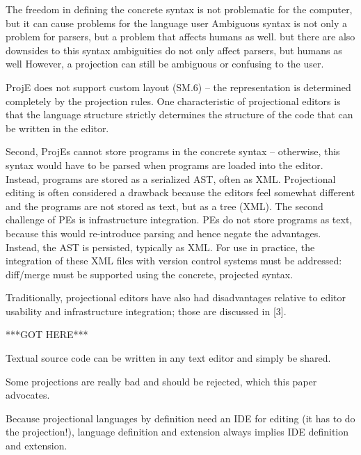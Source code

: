The freedom in defining the concrete syntax is not problematic for the computer, but it can cause problems for the language user 
Ambiguous syntax is not only a problem for parsers, but a problem that affects humans as well. 
but there are also downsides to this syntax ambiguities do not only affect parsers, but humans as well 
However, a projection can still be ambiguous or confusing to the user.

ProjE does not support custom layout (SM.6) – the representation is determined completely by the projection rules.
One characteristic of projectional editors is that the language structure strictly determines the structure of the code that can be written in the editor.

Second, ProjEs cannot store programs in the concrete syntax – otherwise, this syntax would have to be parsed when programs are loaded into the editor.
Instead, programs are stored as a serialized AST, often as XML. 
Projectional editing is often considered a drawback because the editors feel somewhat different and the programs are not stored as text, but as a tree (XML).
The second challenge of PEs is infrastructure integration.
PEs do not store programs as text, because this would re-introduce parsing and hence negate the advantages.
Instead, the AST is persisted, typically as XML.
For use in practice, the integration of these XML files with version control systems must be addressed: diff/merge must be supported using the concrete, projected syntax.

Traditionally, projectional editors have also had disadvantages relative to editor usability and infrastructure integration; those are discussed in [3].

***GOT HERE***

Textual source code can be written in any text editor and simply be shared.


Some projections are really bad and should be rejected, which this paper advocates.

Because projectional languages by definition need an IDE for editing (it has to do the projection!), language definition and extension always implies IDE definition and extension.


